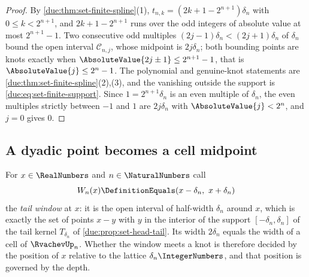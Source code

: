 \documentclass[11pt,oneside]{article}
\theoremstyle{plain}
\theoremstyle{definition}
\theoremstyle{remark}
\newcommand{\upn}[1]{\RvachevUp_{#1}}
\begin{document}
\begin{proof}
By \cref{due:thm:set-finite-spline}(1), $t_{n,k}=(2k+1-2^{n+1})\delta_n$
with $0\le k<2^{n+1}$, and $2k+1-2^{n+1}$ runs over the odd integers of
absolute value at most $2^{n+1}-1$.  Two consecutive odd multiples
$(2j-1)\delta_n<(2j+1)\delta_n$ of $\delta_n$ bound the open interval
$\mathcal C_{n,j}$, whose midpoint is $2j\delta_n$; both bounding points
are knots exactly when $\AbsoluteValue{2j\pm1}\le2^{n+1}-1$, that is
$\AbsoluteValue{j}\le2^{n}-1$.  The polynomial and genuine-knot statements
are \cref{due:thm:set-finite-spline}(2),(3), and the vanishing outside the
support is \cref{due:eq:set-finite-support}.  Since $1=2^{n+1}\delta_n$ is
an even multiple of $\delta_n$, the even multiples strictly between $-1$
and $1$ are $2j\delta_n$ with $\AbsoluteValue{j}<2^{n}$, and $j=0$ gives
$0$.
\end{proof}

\subsection{A dyadic point becomes a cell midpoint}
\label{due:sec:set-midpoint}

For $x\in\RealNumbers$ and $n\in\NaturalNumbers$ call
\begin{equation}
 W_n(x)\DefinitionEquals(x-\delta_n,\ x+\delta_n)
 \label{due:eq:set-tail-window}
\end{equation}
the \emph{tail window} at $x$: it is the open interval of half-width
$\delta_n$ around $x$, which is exactly the set of points $x-y$ with $y$
in the interior of the support $[-\delta_n,\delta_n]$ of the tail kernel
$T_{\delta_n}$ of \cref{due:prop:set-head-tail}.  Its width $2\delta_n$
equals the width of a cell of $\upn{n}$.  Whether the window meets a knot
is therefore decided by the position of $x$ relative to the lattice
$\delta_n\IntegerNumbers$, and that position is governed by the depth.
\end{document}
